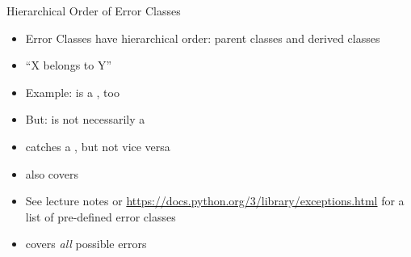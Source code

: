 
\begin{frame}[fragile]{Hierarchical Order of Error Classes}
%
\begin{itemize}
\item Error Classes have hierarchical order: parent classes and derived classes
\item \enquote{X belongs to Y}
\item Example:  is a , too
\item But:  is not necessarily a 
\item[\Thus]  catches a , but not vice versa
\item \eg {} also covers 
\item See lecture notes or \url{https://docs.python.org/3/library/exceptions.html} for a list of pre-defined error classes
\item {} covers \emph{all} possible errors
\end{itemize}
%
\end{frame}


